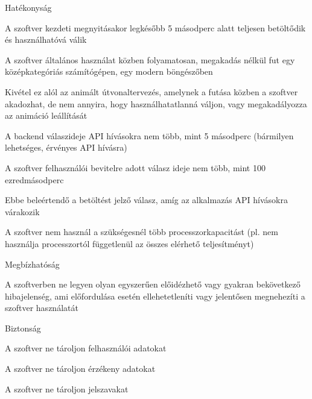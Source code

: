 \begin{enumerate}
    \item Hatékonyság
    \begin{compactitem}     
        \item A szoftver kezdeti megnyitásakor legkésőbb 5 másodperc alatt teljesen betöltődik és használhatóvá válik
        \item A szoftver általános használat közben folyamatosan, megakadás nélkül fut egy középkategóriás számítógépen, egy modern böngészőben
        \begin{compactitem}     
            \item Kivétel ez alól az animált útvonaltervezés, amelynek a futása közben a szoftver akadozhat, de nem annyira, hogy használhatatlanná váljon, vagy megakadályozza az animáció leállítását
        \end{compactitem}
        \item A backend válaszideje API hívásokra nem több, mint 5 másodperc (bármilyen lehetséges, érvényes API hívásra)
        \item A szoftver felhasználói bevitelre adott válasz ideje nem több, mint 100 ezredmásodperc
        \begin{compactitem}     
            \item Ebbe beleértendő a betöltést jelző válasz, amíg az alkalmazás API hívásokra várakozik
        \end{compactitem}
        \item A szoftver nem használ a szükségesnél több processzorkapacitást (pl. nem használja processzortól függetlenül az összes elérhető teljesítményt)
    \end{compactitem}
    \item Megbízhatóság
    \begin{compactitem}
        \item A szoftverben ne legyen olyan egyszerűen előidézhető vagy gyakran bekövetkező hibajelenség, ami előfordulása esetén ellehetetleníti vagy jelentősen megnehezíti a szoftver használatát
    \end{compactitem}
    \item Biztonság
    \begin{compactitem}
        \item A szoftver ne tároljon felhasználói adatokat
        \item A szoftver ne tároljon érzékeny adatokat
        \item A szoftver ne tároljon jelszavakat
    \end{compactitem}

\end{enumerate}
